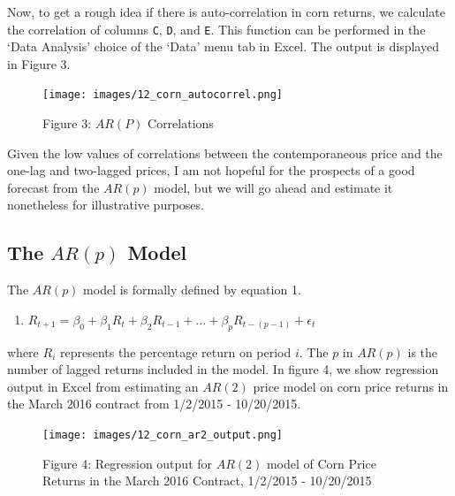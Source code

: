 \documentclass[
  letterpaper,
  DIV=11,
  numbers=noendperiod]{scrreprt}
\providecommand{\tightlist}{%
  \setlength{\itemsep}{0pt}\setlength{\parskip}{0pt}}\usepackage{longtable,booktabs,array}
\begin{document}
Now, to get a rough idea if there is auto-correlation in corn returns,
we calculate the correlation of columns \texttt{C}, \texttt{D}, and
\texttt{E}. This function can be performed in the `Data Analysis' choice
of the `Data' menu tab in Excel. The output is displayed in Figure 3.

\begin{figure}[H]

{\centering \texttt{[image: images/12\_corn\_autocorrel.png]}

}

\caption{Figure 3: \(AR(P)\) Correlations}

\end{figure}%

Given the low values of correlations between the contemporaneous price
and the one-lag and two-lagged prices, I am not hopeful for the
prospects of a good forecast from the \(AR(p)\) model, but we will go
ahead and estimate it nonetheless for illustrative purposes.

\subsection{\texorpdfstring{The \(AR(p)\)
Model}{The AR(p) Model}}\label{the-arp-model}

The \(AR(p)\) model is formally defined by equation 1.

\begin{enumerate}
\def\labelenumi{\arabic{enumi}.}
\tightlist
\item
  \(R_{t+1} = \beta_0 + \beta_1R_{t} + \beta_2R_{t-1}+ ... + \beta_{p}R_{t-(p-1)} + \epsilon_t\)
\end{enumerate}

where \(R_i\) represents the percentage return on period \(i\). The
\(p\) in \(AR(p)\) is the number of lagged returns included in the
model. In figure 4, we show regression output in Excel from estimating
an \(AR(2)\) price model on corn price returns in the March 2016
contract from 1/2/2015 - 10/20/2015.

\begin{figure}[H]

{\centering \texttt{[image: images/12\_corn\_ar2\_output.png]}

}

\caption{Figure 4: Regression output for \(AR(2)\) model of Corn Price
Returns in the March 2016 Contract, 1/2/2015 - 10/20/2015}

\end{figure}%
\end{document}
